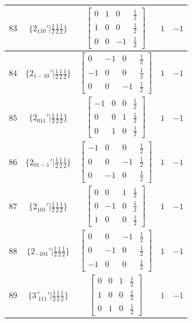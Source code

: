 \documentclass[fleqn,8pt]{jsarticle}
\begin{document}
\begin{longtable}{ccccc}
$ 83 $ & $ \{2{}_{110}{}'|\frac{1}{2} \frac{1}{2} \frac{1}{2}\} $ & $ \begin{bmatrix} 0 & 1 & 0 & \frac{1}{2} \\ 1 & 0 & 0 & \frac{1}{2} \\ 0 & 0 & -1 & \frac{1}{2} \end{bmatrix} $ & $ 1 $ & $ -1 $ \\ \hline
$ 84 $ & $ \{2{}_{1-10}{}'|\frac{1}{2} \frac{1}{2} \frac{1}{2}\} $ & $ \begin{bmatrix} 0 & -1 & 0 & \frac{1}{2} \\ -1 & 0 & 0 & \frac{1}{2} \\ 0 & 0 & -1 & \frac{1}{2} \end{bmatrix} $ & $ 1 $ & $ -1 $ \\ \hline
$ 85 $ & $ \{2{}_{011}{}'|\frac{1}{2} \frac{1}{2} \frac{1}{2}\} $ & $ \begin{bmatrix} -1 & 0 & 0 & \frac{1}{2} \\ 0 & 0 & 1 & \frac{1}{2} \\ 0 & 1 & 0 & \frac{1}{2} \end{bmatrix} $ & $ 1 $ & $ -1 $ \\ \hline
$ 86 $ & $ \{2{}_{01-1}{}'|\frac{1}{2} \frac{1}{2} \frac{1}{2}\} $ & $ \begin{bmatrix} -1 & 0 & 0 & \frac{1}{2} \\ 0 & 0 & -1 & \frac{1}{2} \\ 0 & -1 & 0 & \frac{1}{2} \end{bmatrix} $ & $ 1 $ & $ -1 $ \\ \hline
$ 87 $ & $ \{2{}_{101}{}'|\frac{1}{2} \frac{1}{2} \frac{1}{2}\} $ & $ \begin{bmatrix} 0 & 0 & 1 & \frac{1}{2} \\ 0 & -1 & 0 & \frac{1}{2} \\ 1 & 0 & 0 & \frac{1}{2} \end{bmatrix} $ & $ 1 $ & $ -1 $ \\ \hline
$ 88 $ & $ \{2{}_{-101}{}'|\frac{1}{2} \frac{1}{2} \frac{1}{2}\} $ & $ \begin{bmatrix} 0 & 0 & -1 & \frac{1}{2} \\ 0 & -1 & 0 & \frac{1}{2} \\ -1 & 0 & 0 & \frac{1}{2} \end{bmatrix} $ & $ 1 $ & $ -1 $ \\ \hline
$ 89 $ & $ \{3^{+}_{\,\,111}{}'|\frac{1}{2} \frac{1}{2} \frac{1}{2}\} $ & $ \begin{bmatrix} 0 & 0 & 1 & \frac{1}{2} \\ 1 & 0 & 0 & \frac{1}{2} \\ 0 & 1 & 0 & \frac{1}{2} \end{bmatrix} $ & $ 1 $ & $ -1 $ \\ \hline

\end{longtable}
\end{document}
